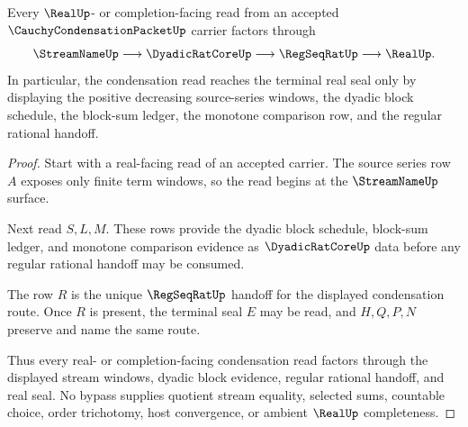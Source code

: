\begin{theorem}
\label{thm:cauchy-condensation-packet-real-handoff}
Every $\RealUp$- or completion-facing read from an accepted $\CauchyCondensationPacketUp$ carrier factors through
$$
\StreamNameUp \longrightarrow \DyadicRatCoreUp \longrightarrow \RegSeqRatUp \longrightarrow \RealUp .
$$
In particular, the condensation read reaches the terminal real seal only by displaying the positive decreasing source-series windows, the dyadic block schedule, the block-sum ledger, the monotone comparison row, and the regular rational handoff.
\end{theorem}
\begin{proof}
Start with a real-facing read of an accepted carrier. The source series row $A$ exposes only finite term windows, so the read begins at the $\StreamNameUp$ surface.

Next read $S,L,M$. These rows provide the dyadic block schedule, block-sum ledger, and monotone comparison evidence as $\DyadicRatCoreUp$ data before any regular rational handoff may be consumed.

The row $R$ is the unique $\RegSeqRatUp$ handoff for the displayed condensation route. Once $R$ is present, the terminal seal $E$ may be read, and $H,Q,P,N$ preserve and name the same route.

Thus every real- or completion-facing condensation read factors through the displayed stream windows, dyadic block evidence, regular rational handoff, and real seal. No bypass supplies quotient stream equality, selected sums, countable choice, order trichotomy, host convergence, or ambient $\RealUp$ completeness.
\end{proof}




